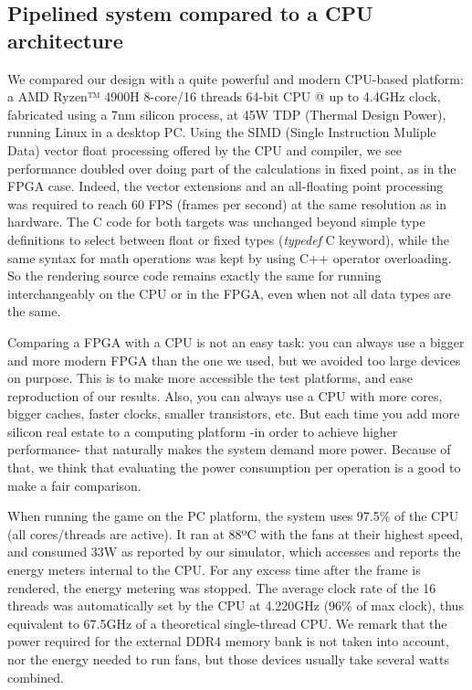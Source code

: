 \documentclass[conference]{IEEEtran}
\begin{document}
\subsection{Pipelined system compared to a CPU architecture}

We compared our design with a quite powerful and modern CPU-based platform: a AMD Ryzen™ 4900H 8-core/16 threads 64-bit CPU @ up to 4.4GHz clock, fabricated using a 7nm silicon process, at 45W TDP (Thermal Design Power), running Linux in a desktop PC. Using the SIMD (Single Instruction Muliple Data) vector float processing offered by the CPU and compiler, we see performance doubled over doing part of the calculations in fixed point, as in the FPGA case. Indeed, the vector extensions and an all-floating point processing was required to reach 60 FPS (frames per second) at the same resolution as in hardware. The C code for both targets was unchanged beyond simple type definitions to select between float or fixed types (\textit{typedef} C keyword), while the same syntax for math operations was kept by using C++ operator overloading. So the rendering source code remains exactly the same for running interchangeably on the CPU or in the FPGA, even when not all data types are the same.

Comparing a FPGA with a CPU is not an easy task: you can always use a bigger and more modern FPGA than the one we used, but we avoided too large devices on purpose. This is to make more accessible the test platforms, and ease reproduction of our results. Also, you can always use a CPU with more cores, bigger caches, faster clocks, smaller transistors, etc. But each time you add more silicon real estate to a computing platform -in order to achieve higher performance- that naturally makes the system demand more power. Because of that, we think that evaluating the power consumption per operation is a good to make a fair comparison.

When running the game on the PC platform, the system uses 97.5\% of the CPU (all cores/threads are active). It ran at 88ºC with the fans at their highest speed, and consumed 33W as reported by our simulator, which accesses and reports the energy meters internal to the CPU. For any excess time after the frame is rendered, the energy metering was stopped. The average clock rate of the 16 threads was automatically set by the CPU at 4.220GHz (96\% of max clock), thus equivalent to 67.5GHz of a theoretical single-thread CPU. We remark that the power required for the external DDR4 memory bank is not taken into account, nor the energy needed to run fans, but those devices usually take several watts combined.
\end{document}
